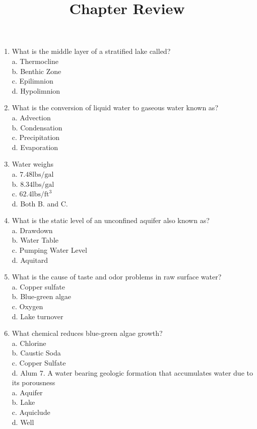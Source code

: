 \documentclass[10pt]{article}
\title{Chapter Review }
\author{}
\date{}
\begin{document}
\maketitle
\begin{enumerate}
  \item What is the middle layer of a stratified lake called?\\
a. Thermocline\\
b. Benthic Zone\\
c. Epilimnion\\
d. Hypolimnion

  \item What is the conversion of liquid water to gaseous water known as?\\
a. Advection\\
b. Condensation\\
c. Precipitation\\
d. Evaporation

  \item Water weighs\\
a. $7.48 \mathrm{lbs} / \mathrm{gal}$\\
b. $8.34 \mathrm{lbs} / \mathrm{gal}$\\
c. $62.4 \mathrm{lbs} / \mathrm{ft}^{3}$\\
d. Both B. and C.

  \item What is the static level of an unconfined aquifer also known as?\\
a. Drawdown\\
b. Water Table\\
c. Pumping Water Level\\
d. Aquitard

  \item What is the cause of taste and odor problems in raw surface water?\\
a. Copper sulfate\\
b. Blue-green algae\\
c. Oxygen\\
d. Lake turnover

  \item What chemical reduces blue-green algae growth?\\
a. Chlorine\\
b. Caustic Soda\\
c. Copper Sulfate\\
d. Alum 7. A water bearing geologic formation that accumulates water due to its porousness\\
a. Aquifer\\
b. Lake\\
c. Aquiclude\\
d. Well


\end{enumerate}
\end{document}
